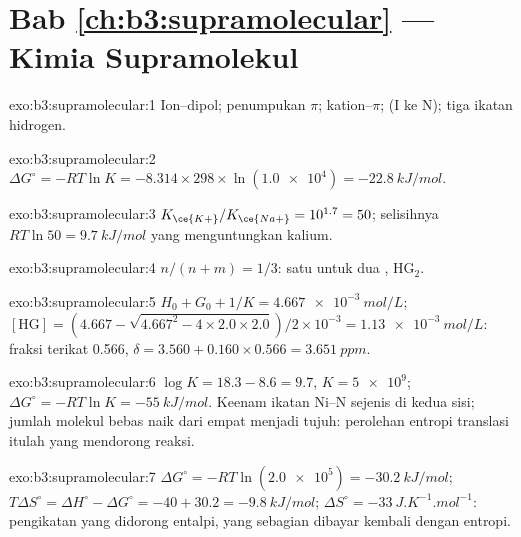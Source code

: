 \section*{Bab \ref{ch:b3:supramolecular} --- Kimia Supramolekul}

\begin{solution}{exo:b3:supramolecular:1}
Ion--dipol; penumpukan $\pi$; kation--$\pi$;  (I ke N); tiga ikatan hidrogen.
\end{solution}

\begin{solution}{exo:b3:supramolecular:2}
$\Delta G^\circ = -RT\ln K = -8.314 \times 298 \times \ln(\num{1.0e4}) = \qty{-22.8}{kJ/mol}$.
\end{solution}

\begin{solution}{exo:b3:supramolecular:3}
$K_{\ce{K+}}/K_{\ce{Na+}} = 10^{1.7} = 50$; selisihnya $RT\ln 50 = \qty{9.7}{kJ/mol}$ yang menguntungkan kalium.
\end{solution}

\begin{solution}{exo:b3:supramolecular:4}
$n/(n + m) = 1/3$: satu  untuk dua , $\mathrm{HG_2}$.
\end{solution}

\begin{solution}{exo:b3:supramolecular:5}
$H_0 + G_0 + 1/K = \qty{4.667e-3}{mol/L}$; $[\mathrm{HG}] = (4.667 - \sqrt{4.667^2 - 4 \times 2.0 \times 2.0})/2 \times 10^{-3} = \qty{1.13e-3}{mol/L}$: fraksi
terikat 0.566, $\delta = 3.560 + 0.160 \times 0.566 = \qty{3.651}{ppm}$.
\end{solution}

\begin{solution}{exo:b3:supramolecular:6}
$\log K = 18.3 - 8.6 = 9.7$, $K = \num{5e9}$; $\Delta G^\circ = -RT\ln K = \qty{-55}{kJ/mol}$. Keenam ikatan Ni--N
sejenis di kedua sisi; jumlah molekul bebas naik dari empat menjadi
tujuh: perolehan entropi translasi itulah yang mendorong reaksi.
\end{solution}

\begin{solution}{exo:b3:supramolecular:7}
$\Delta G^\circ = -RT\ln(\num{2.0e5}) = \qty{-30.2}{kJ/mol}$; $T\Delta S^\circ = \Delta H^\circ - \Delta G^\circ = -40 + 30.2 = \qty{-9.8}{kJ/mol}$;
$\Delta S^\circ = \qty{-33}{J.K^{-1}.mol^{-1}}$: pengikatan yang didorong entalpi, yang sebagian dibayar kembali dengan entropi.
\end{solution}

